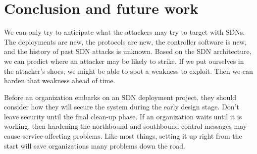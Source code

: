 \chapter{Conclusion and future work}
\label{conclusion}

We can only try to anticipate what the attackers may try to target with SDNs.  The deployments are new, the protocols are new, the controller software is new, and the history of past SDN attacks is unknown.  Based on the SDN architecture, we can predict where an attacker may be likely to strike.  If we put ourselves in the attacker’s shoes, we might be able to spot a weakness to exploit.  Then we can harden that weakness ahead of time.

Before an organization embarks on an SDN deployment project, they should consider how they will secure the system during the early design stage.  Don’t leave security until the final clean-up phase.  If an organization waits until it is working, then hardening the northbound and southbound control messages may cause service-affecting problems.  Like most things, setting it up right from the start will save organizations many problems down the road.

